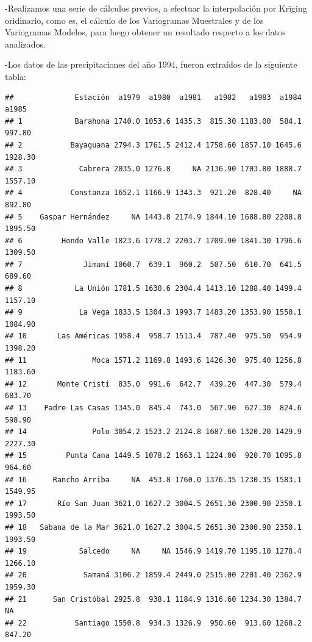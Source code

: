 \documentclass[11pt,]{article}
\newenvironment{Shaded}{\begin{snugshade}}{\end{snugshade}}
\newcommand{\KeywordTok}[1]{\textcolor[rgb]{0.13,0.29,0.53}{\textbf{#1}}}
\newcommand{\StringTok}[1]{\textcolor[rgb]{0.31,0.60,0.02}{#1}}
\newcommand{\OperatorTok}[1]{\textcolor[rgb]{0.81,0.36,0.00}{\textbf{#1}}}
\newcommand{\NormalTok}[1]{#1}
\begin{document}
-Realizamos una serie de cálculos previos, a efectuar la interpolación
por Kriging oridinario, como es, el cálculo de los Variogramas
Muestrales y de los Variogramas Modelos, para luego obtener un resultado
respecto a los datos analizados.

-Los datos de las precipitaciones del año 1994, fueron extraídos de la
siguiente tabla:

\begin{Shaded}
\end{Shaded}

\begin{verbatim}
##              Estación  a1979  a1980  a1981   a1982   a1983  a1984   a1985
## 1            Barahona 1740.0 1053.6 1435.3  815.30 1183.00  584.1  997.80
## 2           Bayaguana 2794.3 1761.5 2412.4 1758.60 1857.10 1645.6 1928.30
## 3             Cabrera 2035.0 1276.8     NA 2136.90 1703.80 1888.7 1557.10
## 4           Constanza 1652.1 1166.9 1343.3  921.20  828.40     NA  892.80
## 5    Gaspar Hernández     NA 1443.8 2174.9 1844.10 1688.80 2208.8 1895.50
## 6         Hondo Valle 1823.6 1778.2 2203.7 1709.90 1841.30 1796.6 1309.50
## 7              Jimaní 1060.7  639.1  960.2  507.50  610.70  641.5  689.60
## 8            La Unión 1781.5 1630.6 2304.4 1413.10 1288.40 1499.4 1157.10
## 9             La Vega 1833.5 1304.3 1993.7 1483.20 1353.90 1550.1 1084.90
## 10       Las Américas 1958.4  958.7 1513.4  787.40  975.50  954.9 1398.20
## 11               Moca 1571.2 1169.8 1493.6 1426.30  975.40 1256.8 1183.60
## 12       Monte Cristi  835.0  991.6  642.7  439.20  447.30  579.4  683.70
## 13    Padre Las Casas 1345.0  845.4  743.0  567.90  627.30  824.6  598.90
## 14               Polo 3054.2 1523.2 2124.8 1687.60 1320.20 1429.9 2227.30
## 15         Punta Cana 1449.5 1078.2 1663.1 1224.00  920.70 1095.8  964.60
## 16      Rancho Arriba     NA  453.8 1760.0 1376.35 1230.35 1583.1 1549.95
## 17       Río San Juan 3621.0 1627.2 3004.5 2651.30 2300.90 2350.1 1993.50
## 18   Sabana de la Mar 3621.0 1627.2 3004.5 2651.30 2300.90 2350.1 1993.50
## 19            Salcedo     NA     NA 1546.9 1419.70 1195.10 1278.4 1266.10
## 20             Samaná 3106.2 1859.4 2449.0 2515.00 2201.40 2362.9 1959.30
## 21      San Cristóbal 2925.8  938.1 1184.9 1316.60 1234.30 1384.7      NA
## 22           Santiago 1550.8  934.3 1326.9  950.60  913.60 1268.2  847.20

\end{verbatim}
\end{document}
